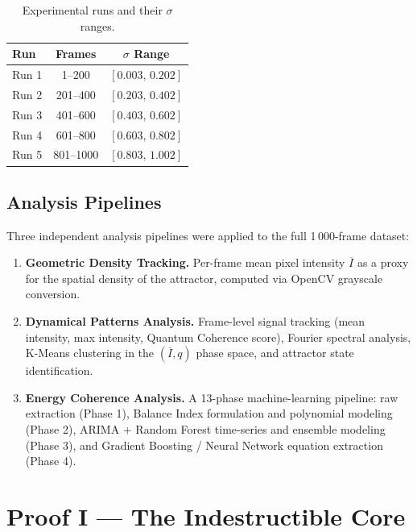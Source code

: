 \documentclass[twocolumn,amsmath,amssymb,prl]{revtex4-2}
\begin{document}
\begin{table}[h]
\centering
\caption{Experimental runs and their $\sigma$ ranges.}
\label{tab:runs}
\begin{tabular}{lcc}
\toprule
Run & Frames & $\sigma$ Range \\
\midrule
Run 1 & 1–200   & $[0.003,\, 0.202]$ \\
Run 2 & 201–400 & $[0.203,\, 0.402]$ \\
Run 3 & 401–600 & $[0.403,\, 0.602]$ \\
Run 4 & 601–800 & $[0.603,\, 0.802]$ \\
Run 5 & 801–1000 & $[0.803,\, 1.002]$ \\
\bottomrule
\end{tabular}
\end{table}

\subsection{Analysis Pipelines}

Three independent analysis pipelines were applied to the full 1\,000-frame
dataset:

\begin{enumerate}
  \item \textbf{Geometric Density Tracking.}  Per-frame mean pixel intensity
        $\overline{I}$ as a proxy for the spatial density of the attractor,
        computed via OpenCV grayscale conversion.
  \item \textbf{Dynamical Patterns Analysis.}  Frame-level signal tracking
        (mean intensity, max intensity, Quantum Coherence score), Fourier
        spectral analysis, K-Means clustering in the
        $(\overline{I}, q)$ phase space, and attractor state identification.
  \item \textbf{Energy Coherence Analysis.}  A 13-phase machine-learning
        pipeline: raw extraction (Phase 1), Balance Index formulation and
        polynomial modeling (Phase 2), ARIMA + Random Forest time-series
        and ensemble modeling (Phase 3), and Gradient Boosting / Neural
        Network equation extraction (Phase 4).
\end{enumerate}

\section{Proof I — The Indestructible Core}
\label{sec:proofs}
\end{document}
